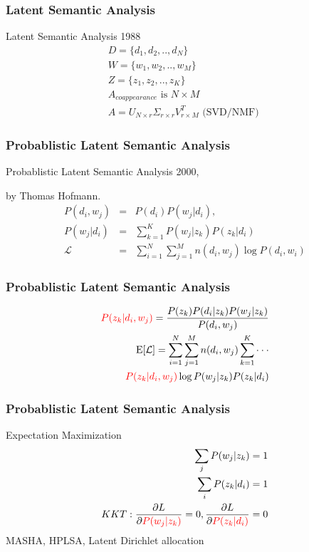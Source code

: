 \documentclass[professionalfonts]{beamer}
\begin{document}
\begin{frame}
\frametitle{Latent Semantic Analysis}
Latent Semantic Analysis 1988
\begin{eqnarray}
D=\{d_1,d_2,..,d_{N} \} \\
W=\{w_1,w_2,..,w_{M} \} \\
Z=\{ z_1,z_2,..,z_{K} \} \\
A_{coappearance} \text{ is }  N \times M \\
A=U_{N \times r } \Sigma_{r \times r} V^{T}_{r \times M } \text{ (SVD/NMF) }
\end{eqnarray}
\end{frame}


\begin{frame}
\frametitle{Probablistic Latent Semantic Analysis}
Probablistic Latent Semantic Analysis 2000,

by Thomas Hofmann.
\begin{eqnarray}
P(d_i,w_j)& =& P(d_i) P(w_j | d_i), \\
P(w_j | d_i) &=& \sum_{k=1}^{K} P(w_j | z_k) P(z_k | d_i) \\
\mathcal{L} &=& \sum_{i=1}^N \sum_{j=1}^M n(d_i,w_j) \log P(d_i,w_i)
\end{eqnarray}
\end{frame}


\begin{frame}
\frametitle{Probablistic Latent Semantic Analysis}
\begin{eqnarray}
{\color{red} P(z_k|d_i,w_j) } = \frac{P(z_k)P(d_i|z_k)P(w_j|z_k)}{P(d_i,w_j)} \\
\text{E}[\mathcal{L}] =  \sum_{i=1}^N \sum_{j=1}^M n(d_i,w_j) \sum_{k=1}^{K} \cdot \cdot \cdot  \\
{\color{red} P(z_k|d_i,w_j) } \log  P(w_j|z_k)P(z_k|d_i)
\end{eqnarray}
\end{frame}


\begin{frame}
\frametitle{Probablistic Latent Semantic Analysis}
Expectation Maximization
\begin{eqnarray}
\sum_{j} P(w_j|z_k) =1\\
\sum_{i} P(z_k|d_i) =1\\
KKT:\frac{\partial L }{\partial {\color{red} P(w_j|z_k) }} =0, \frac{\partial L}{\partial {\color{red} P(z_k|d_i)} } =0
\end{eqnarray}
MASHA, HPLSA, Latent Dirichlet allocation
\end{frame}
\end{document}
